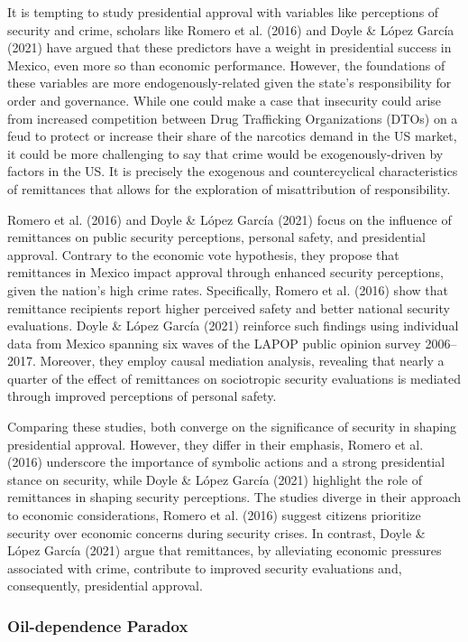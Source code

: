 \documentclass[
]{article}
\begin{document}
It is tempting to study presidential approval with variables like
perceptions of security and crime, scholars like Romero et al. (2016)
and Doyle \& López García (2021) have argued that these predictors have
a weight in presidential success in Mexico, even more so than economic
performance. However, the foundations of these variables are more
endogenously-related given the state's responsibility for order and
governance. While one could make a case that insecurity could arise from
increased competition between Drug Trafficking Organizations (DTOs) on a
feud to protect or increase their share of the narcotics demand in the
US market, it could be more challenging to say that crime would be
exogenously-driven by factors in the US. It is precisely the exogenous
and countercyclical characteristics of remittances that allows for the
exploration of misattribution of responsibility.

Romero et al. (2016) and Doyle \& López García (2021) focus on the
influence of remittances on public security perceptions, personal
safety, and presidential approval. Contrary to the economic vote
hypothesis, they propose that remittances in Mexico impact approval
through enhanced security perceptions, given the nation's high crime
rates. Specifically, Romero et al. (2016) show that remittance
recipients report higher perceived safety and better national security
evaluations. Doyle \& López García (2021) reinforce such findings using
individual data from Mexico spanning six waves of the LAPOP public
opinion survey 2006--2017. Moreover, they employ causal mediation
analysis, revealing that nearly a quarter of the effect of remittances
on sociotropic security evaluations is mediated through improved
perceptions of personal safety.

Comparing these studies, both converge on the significance of security
in shaping presidential approval. However, they differ in their
emphasis, Romero et al. (2016) underscore the importance of symbolic
actions and a strong presidential stance on security, while Doyle \&
López García (2021) highlight the role of remittances in shaping
security perceptions. The studies diverge in their approach to economic
considerations, Romero et al. (2016) suggest citizens prioritize
security over economic concerns during security crises. In contrast,
Doyle \& López García (2021) argue that remittances, by alleviating
economic pressures associated with crime, contribute to improved
security evaluations and, consequently, presidential approval.

\hypertarget{oil-dependence-paradox}{%
\subsubsection{Oil-dependence Paradox}\label{oil-dependence-paradox}}
\end{document}
